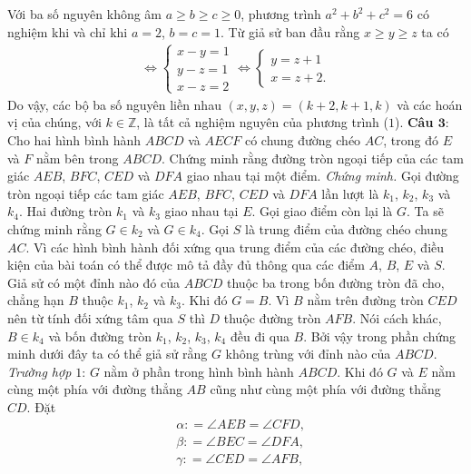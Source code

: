 \begin{multicols}{2}
		Với ba số nguyên không âm $a\ge b \ge c \ge 0$, phương trình $a^2 + b^2 + c^2 = 6$ có nghiệm khi và chỉ khi $a = 2$, $b = c = 1$. Từ giả sử ban đầu rằng $x \ge y \ge z$ ta có
		\begin{align*} 
			\Leftrightarrow
			\begin{cases}
				x - y = 1 \\
				y - z = 1 \\
				x - z = 2
			\end{cases} \Leftrightarrow
			\begin{cases}
				y = z + 1 \\
				x = z + 2.
			\end{cases}
		\end{align*}
		Do vậy, các bộ ba số nguyên liền nhau $(x,y,z) = (k+2, k + 1, k)$ và các hoán vị của chúng, với $k \in \mathbb{Z}$, là tất cả nghiệm nguyên của phương trình ($1$).
	\vskip 0.1cm
	\textbf{\color{cackithi}Câu $\pmb{3}$}: Cho hai hình bình hành $ABCD$ và $AECF$ có chung đường chéo $AC$, trong đó $E$ và $F$ nằm bên trong $ABCD$. Chứng minh rằng đường tròn ngoại tiếp của các tam giác $AEB$, $BFC$, $CED$ và $DFA$ giao nhau tại một điểm. 
	\vskip 0.1cm
	\textit{Chứng minh.}
	Gọi đường tròn ngoại tiếp các tam giác $AEB$, $BFC$, $CED$ và $DFA$ lần lượt là $k_1$, $k_2$, $k_3$ và $k_4$. Hai đường tròn $k_1$ và $k_3$ giao nhau tại $E$. Gọi giao điểm còn lại là $G$. Ta sẽ chứng minh rằng $G \in k_2$ và $G \in k_4$.
	\vskip 0.1cm		
	Gọi $S$ là trung điểm của đường chéo chung $AC$. Vì các hình bình hành đối xứng qua trung điểm của các đường chéo, điều kiện của bài toán có thể được mô tả đầy đủ thông qua các điểm $A$, $B$, $E$ và $S$. 
	\vskip 0.1cm		
	Giả sử có một đỉnh nào đó của $ABCD$ thuộc ba trong bốn đường tròn đã cho, chẳng hạn $B$ thuộc $k_1$, $k_2$ và $k_3$. Khi đó $G = B$. Vì $B$ nằm trên đường tròn $CED$ nên từ tính đối xứng tâm qua $S$ thì $D$ thuộc đường tròn $AFB$. Nói cách khác, $B \in k_4$ và bốn đường tròn $k_1$, $k_2$, $k_3$, $k_4$ đều đi qua $B$. Bởi vậy trong phần chứng minh dưới đây ta có thể giả sử rằng $G$ không trùng với đỉnh nào của $ABCD$.
	\vskip 0.1cm	
	\textit{Trường hợp $1$}: $G$ nằm ở phần trong hình bình hành $ABCD$. Khi đó $G$ và $E$ nằm cùng một phía với đường thẳng $AB$ cũng như cùng một phía với đường thẳng $CD$. Đặt
	\begin{align*}
		&\alpha \colon = \angle AEB = \angle CFD,\\
		&\beta \colon = \angle BEC = \angle DFA,\\
		&\gamma \colon = \angle CED = \angle AFB,\\

\end{align*}
\end{multicols}

